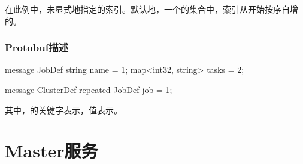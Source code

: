 \begin{content}
在此例中，未显式地指定的索引。默认地，一个的集合中，索引从开始按序自增的。

\subsubsection{Protobuf描述}

\begin{leftbar}
\begin{python}
message JobDef {
  string name = 1;
  map<int32, string> tasks = 2;
}

message ClusterDef {
  repeated JobDef job = 1;
}
\end{python}
\end{leftbar}

其中，的关键字表示，值表示。

\end{content}

\section{Master服务}


